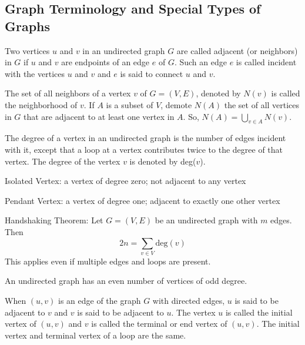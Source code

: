 \documentclass[12pt]{article}
\begin{document}
\subsection{Graph Terminology and Special Types of Graphs}
\begin{definition} Two vertices $u$ and $v$ in an undirected graph $G$ are called adjacent (or neighbors) in $G$ if $u$ and $v$ are endpoints of an edge $e$ of $G$. Such an edge $e$ is called incident with the vertices $u$ and $v$ and $e$ is said to connect $u$ and $v$. \end{definition} 
\begin{definition} The set of all neighbors of a vertex $v$ of $G = (V, E)$, denoted by $N(v)$ is called the neighborhood of $v$. If $A$ is a subset of $V$, demote $N(A)$ the set of all vertices in $G$ that are adjacent to at least one vertex in $A$. So, $N(A) = \bigcup_{v \in A} N(v) $. \end{definition} 
\begin{definition} The degree of a vertex in an undirected graph is the number of edges incident with it, except that a loop at a vertex contributes twice to the degree of that vertex. The degree of the vertex $v$ is denoted by deg($v$). \end{definition} 

\begin{definition} Isolated Vertex: a vertex of degree zero; not adjacent to any vertex \end{definition} 
\begin{definition} Pendant Vertex: a vertex of degree one; adjacent to exactly one other vertex \end{definition} 

\begin{theorem} Handshaking Theorem: Let $G = (V, E)$ be an undirected graph with $m$ edges. Then $$2n = \sum_{v \in V} \text{deg}(v)$$ This applies even if multiple edges and loops are present. \end{theorem} 

\begin{theorem} An undirected graph has an even number of vertices of odd degree. \end{theorem} 

\begin{definition} When $(u, v)$ is an edge of the graph $G$ with directed edges, $u$ is said to be adjacent to $v$ and $v$ is said to be adjacent to $u$. The vertex $u$ is called the initial vertex of $(u, v)$ and $v$ is called the terminal or end vertex of $(u, v)$. The initial vertex and terminal vertex of a loop are the same. \end{definition} 
\end{document}
